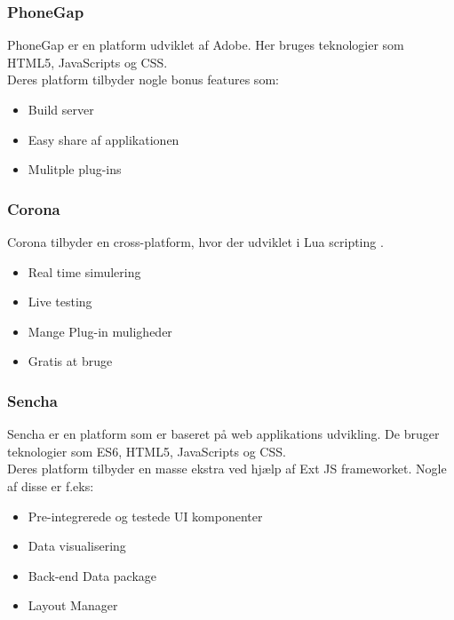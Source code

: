 \subsubsection{PhoneGap}
PhoneGap er en platform udviklet af Adobe\cite{Adobe}. Her bruges teknologier som HTML5\cite{HTML5}, JavaScripts\cite{JavaScript} og CSS\cite{CSS}. \\
Deres platform tilbyder nogle bonus features som:
\begin{itemize}[-]
	\item Build server
	\item Easy share af applikationen 
	\item Mulitple plug-ins
\end{itemize}

\subsubsection{Corona}
Corona tilbyder en cross-platform, hvor der udviklet i Lua scripting \cite{Lua}.
\begin{itemize}[-]
	\item Real time simulering
	\item Live testing
	\item Mange Plug-in muligheder
	\item Gratis at bruge
\end{itemize}

\clearpage

\subsubsection{Sencha}
Sencha er en platform som er baseret på web applikations udvikling. De bruger teknologier som ES6\cite{ES6}, HTML5\cite{HTML5}, JavaScripts\cite{JavaScript} og CSS\cite{CSS}. \\
Deres platform tilbyder en masse ekstra ved hjælp af Ext JS frameworket. Nogle af disse er f.eks:
\begin{itemize}[-]
	\item Pre-integrerede og testede UI komponenter
	\item Data visualisering
	\item Back-end Data package
	\item Layout Manager
\end{itemize}


